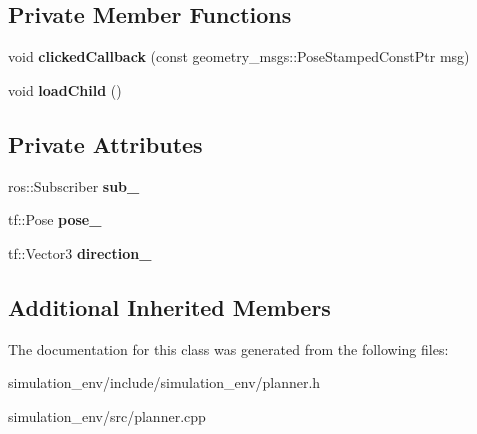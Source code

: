\subsection*{Private Member Functions}
\begin{DoxyCompactItemize}
\item 
void {\bfseries clicked\+Callback} (const geometry\+\_\+msgs\+::\+Pose\+Stamped\+Const\+Ptr msg)\hypertarget{classClickedPosePlanner_a14fd60114064f69a3d4569b10ce244d2}{}\label{classClickedPosePlanner_a14fd60114064f69a3d4569b10ce244d2}

\item 
void {\bfseries load\+Child} ()\hypertarget{classClickedPosePlanner_a8e8e18e8dc6e007bbd0ac40d5aba6076}{}\label{classClickedPosePlanner_a8e8e18e8dc6e007bbd0ac40d5aba6076}

\end{DoxyCompactItemize}
\subsection*{Private Attributes}
\begin{DoxyCompactItemize}
\item 
ros\+::\+Subscriber {\bfseries sub\+\_\+}\hypertarget{classClickedPosePlanner_ae9909d554dfd56cdf729bc9dfa24565b}{}\label{classClickedPosePlanner_ae9909d554dfd56cdf729bc9dfa24565b}

\item 
tf\+::\+Pose {\bfseries pose\+\_\+}\hypertarget{classClickedPosePlanner_a0edb2f1c085b602791a08a1528fe3c27}{}\label{classClickedPosePlanner_a0edb2f1c085b602791a08a1528fe3c27}

\item 
tf\+::\+Vector3 {\bfseries direction\+\_\+}\hypertarget{classClickedPosePlanner_aa677a316251a6a88adcaa52b3c71ea4b}{}\label{classClickedPosePlanner_aa677a316251a6a88adcaa52b3c71ea4b}

\end{DoxyCompactItemize}
\subsection*{Additional Inherited Members}


The documentation for this class was generated from the following files\+:\begin{DoxyCompactItemize}
\item 
simulation\+\_\+env/include/simulation\+\_\+env/planner.\+h\item 
simulation\+\_\+env/src/planner.\+cpp\end{DoxyCompactItemize}
